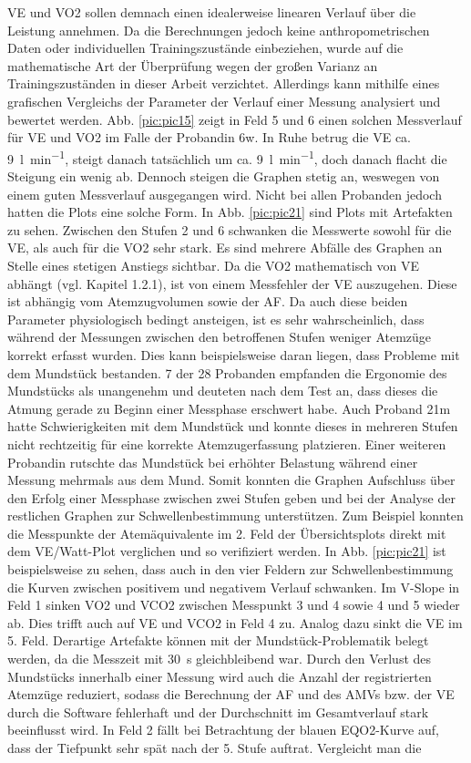 \acs{VE} und \acs{VO2} sollen demnach einen idealerweise linearen Verlauf über die Leistung annehmen. Da die Berechnungen jedoch keine anthropometrischen Daten oder individuellen Trainingszustände einbeziehen, wurde auf die mathematische Art der Überprüfung wegen der großen Varianz an Trainingszuständen in dieser Arbeit verzichtet. Allerdings kann mithilfe eines grafischen Vergleichs der Parameter der Verlauf einer Messung analysiert und bewertet werden. Abb. \ref{pic:pic15} zeigt in Feld 5 und 6 einen solchen Messverlauf für \acs{VE} und \acs{VO2} im Falle der Probandin 6w. In Ruhe betrug die \acs{VE} ca. \SI{9}{\litre\per\minute}, steigt danach tatsächlich um ca. \SI{9}{\litre\per\minute}, doch danach flacht die Steigung ein wenig ab. Dennoch steigen die Graphen stetig an, weswegen von einem guten Messverlauf ausgegangen wird. Nicht bei allen Probanden jedoch hatten die Plots eine solche Form. In Abb. \ref{pic:pic21} sind Plots mit Artefakten zu sehen. Zwischen den Stufen 2 und 6 schwanken die Messwerte sowohl für die \acs{VE}, als auch für die \acs{VO2} sehr stark. Es sind mehrere Abfälle des Graphen an Stelle eines stetigen Anstiegs sichtbar. Da die \acs{VO2} mathematisch von \acs{VE} abhängt (vgl. Kapitel 1.2.1), ist von einem Messfehler der \acs{VE} auszugehen. Diese ist abhängig vom Atemzugvolumen sowie der \acs{AF}. Da auch diese beiden Parameter physiologisch bedingt ansteigen, ist es sehr wahrscheinlich, dass während der Messungen zwischen den betroffenen Stufen weniger Atemzüge korrekt erfasst wurden. Dies kann beispielsweise daran liegen, dass Probleme mit dem Mundstück bestanden. 7 der 28 Probanden empfanden die Ergonomie des Mundstücks als unangenehm und deuteten nach dem Test an, dass dieses die Atmung gerade zu Beginn einer Messphase erschwert habe. Auch Proband 21m hatte Schwierigkeiten mit dem Mundstück und konnte dieses in mehreren Stufen nicht rechtzeitig für eine korrekte Atemzugerfassung platzieren. Einer weiteren Probandin rutschte das Mundstück bei erhöhter Belastung während einer Messung mehrmals aus dem Mund. Somit konnten die Graphen Aufschluss über den Erfolg einer Messphase zwischen zwei Stufen geben und bei der Analyse der restlichen Graphen zur Schwellenbestimmung unterstützen. Zum Beispiel konnten die Messpunkte der Atemäquivalente im 2. Feld der Übersichtsplots direkt mit dem \acs{VE}/Watt-Plot verglichen und so verifiziert werden. In Abb. \ref{pic:pic21} ist beispielsweise zu sehen, dass auch in den vier Feldern zur Schwellenbestimmung die Kurven zwischen positivem und negativem Verlauf schwanken. Im V-Slope in Feld 1 sinken \acs{VO2} und \acs{VCO2} zwischen Messpunkt 3 und 4 sowie 4 und 5 wieder ab. Dies trifft auch auf \acs{VE} und \acs{VCO2} in Feld 4 zu. Analog dazu sinkt die \acs{VE} im 5. Feld. Derartige Artefakte können mit der Mundstück-Problematik belegt werden, da die Messzeit mit \SI{30}{\second} gleichbleibend war. Durch den Verlust des Mundstücks innerhalb einer Messung wird auch die Anzahl der registrierten Atemzüge reduziert, sodass die Berechnung der \acs{AF} und des \acs{AMV}s bzw. der \acs{VE} durch die Software fehlerhaft und der Durchschnitt im Gesamtverlauf stark beeinflusst wird. In Feld 2 fällt bei Betrachtung der blauen \acs{EQO2}-Kurve auf, dass der Tiefpunkt sehr spät nach der 5. Stufe auftrat. Vergleicht man die 